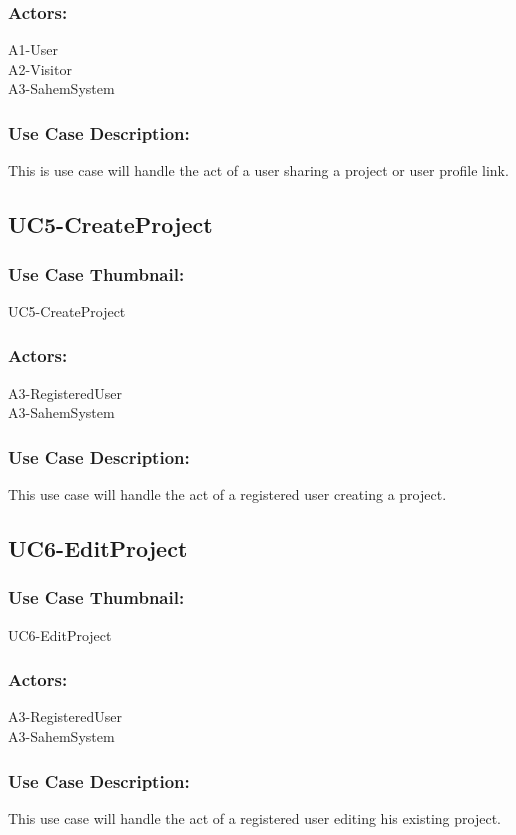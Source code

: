 \documentclass[11pt, openany]{report}
\begin{document}
\subsubsection*{Actors:}
A1-User\\
A2-Visitor\\
A3-SahemSystem
\subsubsection*{Use Case Description:}
This is use case will handle the act of a user sharing a project or user profile link.

\subsection{UC5-CreateProject}
\label{sUC5}
\subsubsection*{Use Case Thumbnail:}
UC5-CreateProject
\subsubsection*{Actors:}
A3-RegisteredUser\\
A3-SahemSystem

\subsubsection*{Use Case Description:}
This use case will handle the act of a registered user creating a project.

\subsection{UC6-EditProject}
\label{sUC6}
\subsubsection*{Use Case Thumbnail:}
UC6-EditProject
\subsubsection*{Actors:}
A3-RegisteredUser\\
A3-SahemSystem

\subsubsection*{Use Case Description:}
This use case will handle the act of a registered user editing his existing project.
\end{document}
